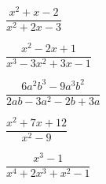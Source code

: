 \begin{esercizio}[*]
\begin{htmulticols}{2}
\begin{enumeratea}
\item \(\dfrac{x^{2}+x-2}{x^{2}+2x-3}\)
\item \(\dfrac{x^{2}-2x+1}{x^{3}-3x^{2}+3x-1}\)
\item \(\dfrac{6a^{2}b^{3}-9a^{3}b^{2}}{2ab\!-\!3a^{2}\!-\!2b\!+\!3a}\)
\item \(\dfrac{x^{2}+7x+12}{x^{2}-9}\)
\item \(\dfrac{x^{3}-1}{x^{4}+2x^{3}+x^{2}-1}\)
\end{enumeratea}
\end{htmulticols}
\end{esercizio}

